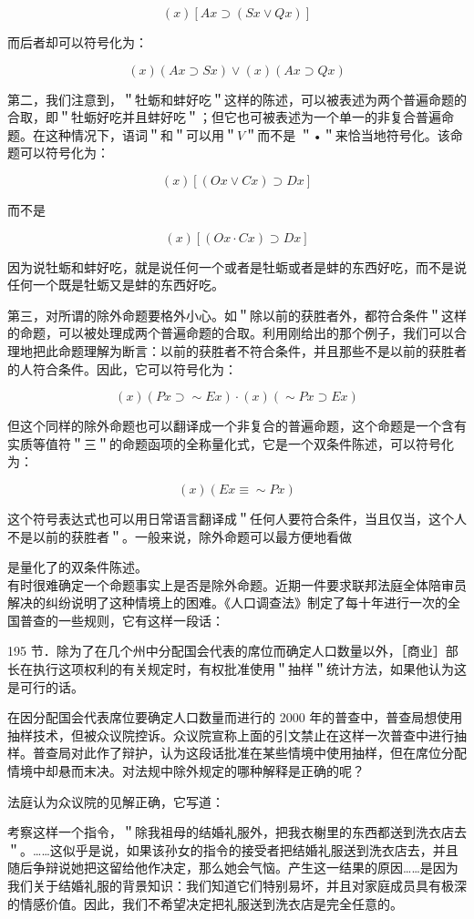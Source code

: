 $$
(x)[A x \supset(S x \vee Q x)]
$$

而后者却可以符号化为：

$$
(x)(A x \supset S x) \vee(x)(A x \supset Q x)
$$

第二，我们注意到，＂牡蛎和蚌好吃＂这样的陈述，可以被表述为两个普遍命题的合取，即＂牡蛎好吃并且蚌好吃＂；但它也可被表述为一个单一的非复合普遍命题。在这种情况下，语词＂和＂可以用＂$V$＂而不是 ＂•＂来恰当地符号化。该命题可以符号化为：

$$
(x)[(O x \vee C x) \supset D x]
$$

而不是

$$
(x)[(O x \cdot C x) \supset D x]
$$

因为说牡蛎和蚌好吃，就是说任何一个或者是牡蛎或者是蚌的东西好吃，而不是说任何一个既是牡蛎又是蚌的东西好吃。

第三，对所谓的除外命题要格外小心。如＂除以前的获胜者外，都符合条件＂这样的命题，可以被处理成两个普遍命题的合取。利用刚给出的那个例子，我们可以合理地把此命题理解为断言：以前的获胜者不符合条件，并且那些不是以前的获胜者的人符合条件。因此，它可以符号化为：

$$
(x)(P x \supset \sim E x) \cdot(x)(\sim P x \supset E x)
$$

但这个同样的除外命题也可以翻译成一个非复合的普遍命题，这个命题是一个含有实质等值符＂三＂的命题函项的全称量化式，它是一个双条件陈述，可以符号化为：

$$
(x)(E x \equiv \sim P x)
$$

这个符号表达式也可以用日常语言翻译成＂任何人要符合条件，当且仅当，这个人不是以前的获胜者＂。一般来说，除外命题可以最方便地看做

是量化了的双条件陈述。\\
有时很难确定一个命题事实上是否是除外命题。近期一件要求联邦法庭全体陪审员解决的纠纷说明了这种情境上的困难。《人口调查法》制定了每十年进行一次的全国普查的一些规则，它有这样一段话：

195 节．除为了在几个州中分配国会代表的席位而确定人口数量以外，［商业］部长在执行这项权利的有关规定时，有权批准使用＂抽样＂统计方法，如果他认为这是可行的话。

在因分配国会代表席位要确定人口数量而进行的 2000 年的普查中，普查局想使用抽样技术，但被众议院控诉。众议院宣称上面的引文禁止在这样一次普查中进行抽样。普查局对此作了辩护，认为这段话批准在某些情境中使用抽样，但在席位分配情境中却悬而末决。对法规中除外规定的哪种解释是正确的呢？

法庭认为众议院的见解正确，它写道：

考察这样一个指令，＂除我祖母的结婚礼服外，把我衣榭里的东西都送到洗衣店去＂。……这似乎是说，如果该孙女的指令的接受者把结婚礼服送到洗衣店去，并且随后争辩说她把这留给他作决定，那么她会气恼。产生这一结果的原因……是因为我们关于结婚礼服的背景知识：我们知道它们特别易坏，并且对家庭成员具有极深的情感价值。因此，我们不希望决定把礼服送到洗衣店是完全任意的。

